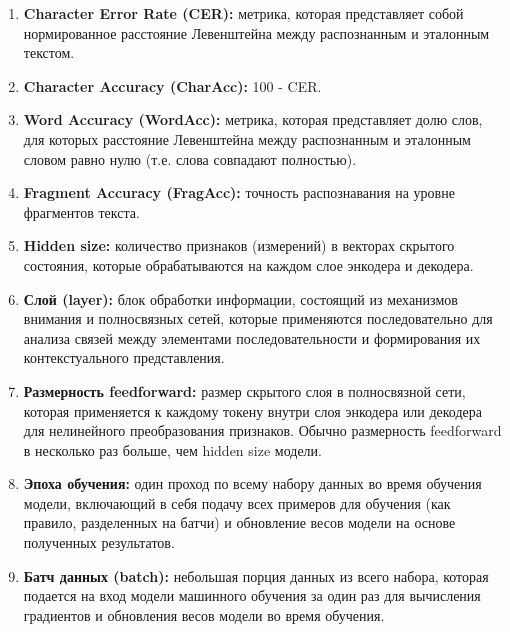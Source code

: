 \begin{enumerate}
    \item  \textbf{Character Error Rate (CER):}  метрика, которая представляет  собой  нормированное  расстояние  Левенштейна между  распознанным  и  эталонным  текстом. 

    \item  \textbf{Character Accuracy (CharAcc):}  100 - CER.
    
    \item  \textbf{Word Accuracy (WordAcc):}  метрика, которая представляет долю  слов,  для  которых  расстояние  Левенштейна  между  распознанным  и  эталонным  словом  равно  нулю  (т.е.  слова  совпадают  полностью).

    \item  \textbf{Fragment Accuracy (FragAcc):}  точность распознавания на уровне фрагментов текста.

    \item  \textbf{Hidden size:} количество признаков (измерений) в векторах скрытого состояния, которые обрабатываются на каждом слое энкодера и декодера. 

    \item  \textbf{Слой (layer):} блок обработки информации, состоящий из механизмов внимания и полносвязных сетей, которые применяются последовательно для анализа связей между элементами последовательности и формирования их контекстуального представления. 

    \item  \textbf{Размерность feedforward:} размер скрытого слоя в полносвязной сети, которая применяется к каждому токену внутри слоя энкодера или декодера для нелинейного преобразования признаков. Обычно размерность feedforward в несколько раз больше, чем hidden size модели. 

    \item  \textbf{Эпоха обучения:} один проход по всему набору данных во время обучения модели, включающий в себя подачу всех примеров для обучения (как правило, разделенных на батчи) и обновление весов модели на основе полученных результатов.

    \item  \textbf{ Батч данных (batch):} небольшая порция данных из всего набора, которая подается на вход модели машинного обучения за один раз для вычисления градиентов и обновления весов модели во время обучения. 


\end{enumerate}
